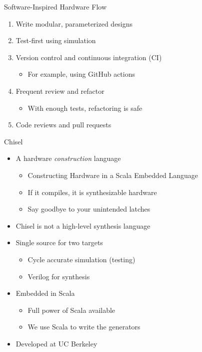\begin{frame}{Software-Inspired Hardware Flow}
\begin{enumerate}
    \item Write modular, parameterized designs
    \item Test-first using simulation
    \item Version control and continuous integration (CI)
    \begin{itemize}
\item For example, using GitHub actions
\end{itemize}
    \item Frequent review and refactor
    \begin{itemize}
\item With enough tests, refactoring is safe
\end{itemize}
    \item Code reviews and pull requests
\end{enumerate}
\end{frame}

\begin{frame}[fragile]{Chisel}
\begin{itemize}
\item A hardware \emph{construction} language
\begin{itemize}
\item Constructing Hardware in a Scala Embedded Language
\item If it compiles, it is synthesizable hardware 
\item Say goodbye to your unintended latches
\end{itemize}
\item Chisel is not a high-level synthesis language
\item Single source for two targets
\begin{itemize}
\item Cycle accurate simulation (testing)
\item Verilog for synthesis
\end{itemize}
\item Embedded in Scala
\begin{itemize}
\item Full power of Scala available
\item We use Scala to write the generators
\end{itemize}
\item Developed at UC Berkeley
\end{itemize}
\end{frame}

